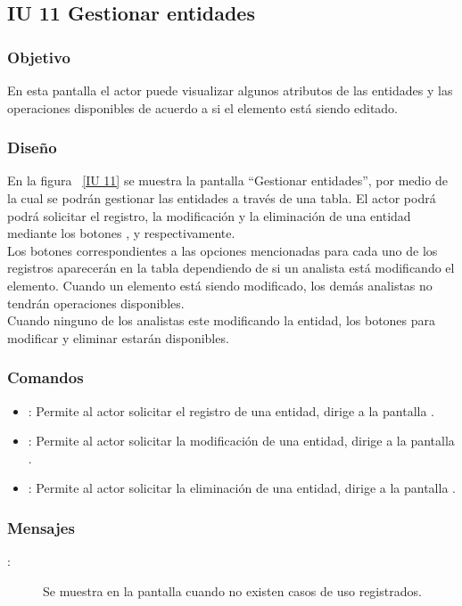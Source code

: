 \subsection{IU 11 Gestionar entidades}
\subsubsection{Objetivo}
	
	En esta pantalla el actor puede visualizar algunos atributos de las entidades y las operaciones disponibles de acuerdo a si el elemento está siendo editado.

\subsubsection{Diseño}

    En la figura ~\ref{IU 11} se muestra la pantalla ``Gestionar entidades'', por medio de la cual 
    se podrán gestionar las entidades a través de una tabla.
    El actor podrá podrá solicitar el registro, la modificación y la eliminación de una entidad mediante los botones
    , \btnEditar y \btnEliminar respectivamente. \\
    
    Los botones correspondientes a las opciones mencionadas para cada uno de los registros aparecerán en la tabla dependiendo de si 
    un analista está modificando el elemento. Cuando un elemento está siendo modificado, los demás analistas no tendrán operaciones disponibles.\\
   
    Cuando ninguno de los analistas este modificando la entidad, los botones para modificar y eliminar estarán disponibles.
    


\subsubsection{Comandos}
\begin{itemize}
	\item {}: Permite al actor solicitar el registro de una entidad, dirige a la pantalla .
	\item \btnEditar[Modificar]: Permite al actor solicitar la modificación de una entidad, dirige a la pantalla .
	\item \btnEliminar[Eliminar]: Permite al actor solicitar la eliminación de una entidad, dirige a la pantalla .
\end{itemize}

\subsubsection{Mensajes}

	
\begin{description}
	\item[:] Se muestra en la pantalla  cuando no existen casos de uso registrados.
\end{description}

